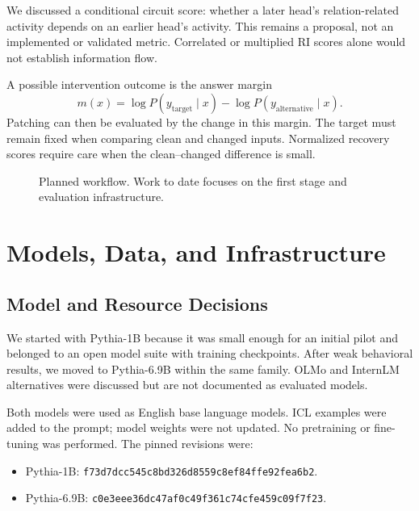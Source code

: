\documentclass[11pt,a4paper]{article}
\newcommand{\file}[1]{\nolinkurl{#1}}
\begin{document}
We discussed a conditional circuit score: whether a later head's relation-related activity depends on an earlier head's activity. This remains a proposal, not an implemented or validated metric. Correlated or multiplied RI scores alone would not establish information flow.

A possible intervention outcome is the answer margin
\[
m(x)=\log P(y_{\mathrm{target}}\mid x)-\log P(y_{\mathrm{alternative}}\mid x).
\]
Patching can then be evaluated by the change in this margin. The target must remain fixed when comparing clean and changed inputs. Normalized recovery scores require care when the clean--changed difference is small.

\begin{figure}[ht]
\centering
{}
\caption{Planned workflow. Work to date focuses on the first stage and evaluation infrastructure.}
\end{figure}

\section{Models, Data, and Infrastructure}
\subsection{Model and Resource Decisions}
We started with Pythia-1B because it was small enough for an initial pilot and belonged to an open model suite with training checkpoints. After weak behavioral results, we moved to Pythia-6.9B within the same family. OLMo and InternLM alternatives were discussed but are not documented as evaluated models.

Both models were used as English base language models. ICL examples were added to the prompt; model weights were not updated. No pretraining or fine-tuning was performed. The pinned revisions were:
\begin{itemize}
\item Pythia-1B: \file{f73d7dcc545c8bd326d8559c8ef84ffe92fea6b2}.
\item Pythia-6.9B: \file{c0e3eee36dc47af0c49f361c74cfe459c09f7f23}.
\end{itemize}
\end{document}
